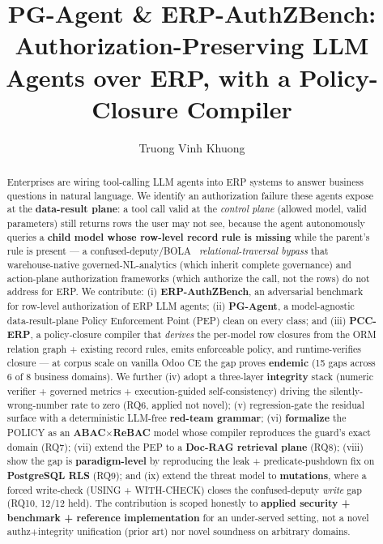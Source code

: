 \documentclass[runningheads]{llncs}
\begin{document}
\title{PG-Agent \& ERP-AuthZBench: Authorization-Preserving LLM Agents over ERP, with a Policy-Closure Compiler}
\author{Truong Vinh Khuong}
\maketitle

\begin{abstract}
Enterprises are wiring tool-calling LLM agents into ERP systems to answer business questions in natural
language. We identify an authorization failure these agents expose at the \textbf{data-result plane}: a tool
call valid at the \emph{control plane} (allowed model, valid parameters) still returns rows the user may not see,
because the agent autonomously queries a \textbf{child model whose row-level record rule is missing} while the
parent's rule is present --- a confused-deputy/BOLA~\cite{owaspbola} \emph{relational-traversal bypass} that
warehouse-native governed-NL-analytics (which inherit complete governance) and action-plane authorization
frameworks (which authorize the call, not the rows) do not address for ERP. We contribute: (i)
\textbf{ERP-AuthZBench}, an adversarial benchmark for row-level authorization of ERP LLM agents; (ii)
\textbf{PG-Agent}, a model-agnostic data-result-plane Policy Enforcement Point (PEP) clean on every class; and
(iii) \textbf{PCC-ERP}, a policy-closure compiler that \emph{derives} the per-model row closures from the ORM
relation graph + existing record rules, emits enforceable policy, and runtime-verifies closure --- at corpus scale
on vanilla Odoo CE the gap proves \textbf{endemic} (15 gaps across 6 of 8 business domains). We further (iv) adopt
a three-layer \textbf{integrity} stack (numeric verifier + governed metrics + execution-guided self-consistency)
driving the silently-wrong-number rate to zero (RQ6, applied not novel); (v) regression-gate the residual surface
with a deterministic LLM-free \textbf{red-team grammar}; (vi) \textbf{formalize} the POLICY as an
\textbf{ABAC$\times$ReBAC} model whose compiler reproduces the guard's exact domain (RQ7); (vii) extend the PEP to
a \textbf{Doc-RAG retrieval plane} (RQ8); (viii) show the gap is \textbf{paradigm-level} by reproducing the leak +
predicate-pushdown fix on \textbf{PostgreSQL RLS} (RQ9); and (ix) extend the threat model to \textbf{mutations},
where a forced write-check (USING + WITH-CHECK) closes the confused-deputy \emph{write} gap (RQ10, 12/12 held). The
contribution is scoped honestly to \textbf{applied security + benchmark + reference implementation} for an
under-served setting, not a novel authz+integrity unification (prior art) nor novel soundness on arbitrary domains.

\end{abstract}
\end{document}
